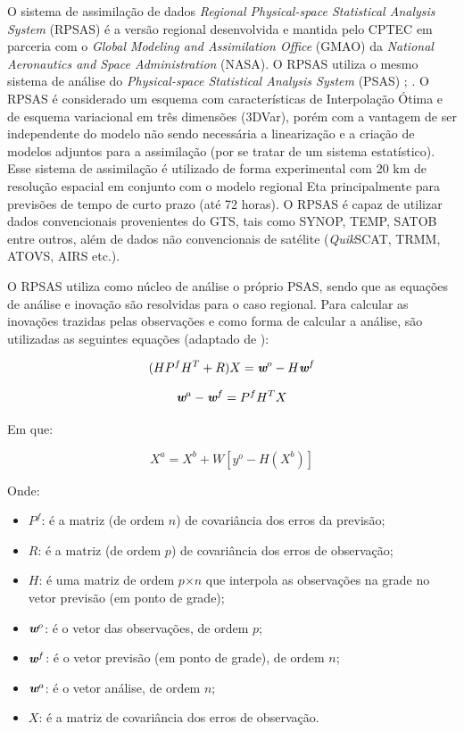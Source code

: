 O sistema de assimilação de dados \textit{Regional Physical-space Statistical Analysis System} (RPSAS) é a versão regional desenvolvida e mantida pelo CPTEC em parceria com o \textit{Global Modeling and Assimilation Office} (GMAO) da \textit{National Aeronautics and Space Administration} (NASA). O RPSAS utiliza o mesmo sistema de análise do \textit{Physical-space Statistical Analysis System} (PSAS) \cite{dasilvaetal95}; \cite{cohnetal98}. O RPSAS é considerado um esquema com características de Interpolação Ótima e de esquema variacional em três dimensões (3DVar), porém com a vantagem de ser independente do modelo não sendo necessária a linearização e a criação de modelos adjuntos para a assimilação (por se tratar de um sistema estatístico). Esse sistema de assimilação é utilizado de forma experimental com 20 km de resolução espacial em conjunto com o modelo regional Eta principalmente para previsões de tempo de curto prazo (até 72 horas). O RPSAS é capaz de utilizar dados convencionais provenientes do GTS, tais como SYNOP, TEMP, SATOB entre outros, além de dados não convencionais de satélite (\textit{Quik}SCAT, TRMM, ATOVS, AIRS etc.).

O RPSAS utiliza como núcleo de análise o próprio PSAS, sendo que as equações de análise e inovação são resolvidas para o caso regional. Para calcular as inovações trazidas pelas observações e como forma de calcular a análise, são utilizadas as seguintes equações (adaptado de ):

\begin{equation}
(HP^{f}H^{T}+R)X=\textit{\textbf{w}}^o-H\textit{\textbf{w}}^f
\label{form01}
\end{equation}

\begin{equation}
\textit{\textbf{w}}^a-\textit{\textbf{w}}^f=P^{f}H^{T}X
\label{form02}
\end{equation}

Em que:

\begin{equation}
X^{a}=X^{b}+W[y^{o}-H(X^{b})]
\label{form03}
\end{equation}

Onde:

\begin{itemize}
\item $P^{f}$: é a matriz (de ordem $n$) de covariância dos erros da previsão;
\item $R$: é a matriz (de ordem $p$) de covariância dos erros de observação;
\item $H$: é uma matriz de ordem $p$$\times$$n$ que interpola as observações na grade no vetor previsão (em ponto de grade);
\item $\textit{\textbf{w}}^o$: é o vetor das observações, de ordem $p$;
\item $\textit{\textbf{w}}^f$: é o vetor previsão (em ponto de grade), de ordem $n$;
\item $\textit{\textbf{w}}^a$: é o vetor análise, de ordem $n$;
\item $\textit{X}$: é a matriz de covariância dos erros de observação.
\end{itemize}

